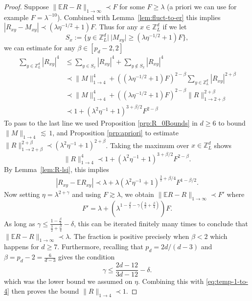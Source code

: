 \documentclass[11pt]{amsart}
\def\bbZ{{\mathbb Z}}
\def\Expec{{\mathbb E}}
\def\lsim{{\,\lesssim\,}}
\newcommand{\ldom}{\prec}
\numberwithin{equation}{section}
\numberwithin{theorem}{section}
\begin{document}
\begin{proof}
Suppose $\|\mathbb{E}R-R\|_{1\to\infty} \ldom F$ for some $F\geq \lambda $ (a priori we can use for example $F = \lambda^{-10}$).
Combined with Lemma~\ref{lem:fluct-to-er} this implies $|R_{xy}-M_{xy}| \ldom (\lambda \eta^{-1/2}+1)F$.
Thus for any $x\in \mathbb{Z}^d_L$ if we let
$$S_x:=\{y\in \mathbb{Z}^d_L |\ |M_{xy}|\geq (\lambda \eta^{-1/2}+1)F\},$$
we can estimate for any $\beta\in[p_d-2,2]$
\begin{align*}
\sum_{y\in \bbZ^d_L} |R_{xy}|^4
&\leq \sum_{y\in S_{x}} |R_{xy}|^4 + \sum_{y\notin S_{x}} |R_{xy}|^4 \\
&\ldom \|M\|_{1\to 4}^4 + ((\lambda \eta^{-1/2} +1)F)^{2-\beta} \sum_{y\in \bbZ^d_L} |R_{xy}|^{2+\beta} \\
&\ldom \|M\|_{1\to 4}^4 + ((\lambda \eta^{-1/2}+1) F)^{2-\beta} \|R\|_{1\to 2+\beta}^{2+\beta}\\
& \ldom 1 + (\lambda^2 \eta^{-1}+1)^{3+\beta/2} F^{2-\beta}
\end{align*}
To pass to the last line we used Proposition \ref{prp:R_0Bounds} in $d\geq 6$ to bound $\|M\|_{1\to 4}\lsim 1$,
and Proposition \ref{prp:apriori} to estimate $\|R\|_{1\to 2+\beta}^{2+\beta}\ldom (\lambda^2\eta^{-1}+1)^{2+\beta}$.
Taking the maximum over $x\in\bbZ^d_L$ shows
\begin{equation}
\label{eq:temp-1-to-4}
\|R\|_{1\to 4}^4\ldom 1 + (\lambda^2 \eta^{-1}+1)^{3+\beta/2} F^{2-\beta}.
\end{equation}
By Lemma~\ref{lem:R-lsi}, this implies
\begin{align*}
|R_{xy} - \Expec R_{xy}| \ldom \lambda + \lambda (\lambda^2\eta^{-1}+1)^{\frac32 + \beta/4} F^{1-\beta/2}.
\end{align*}
Now setting $\eta = \lambda^{2+\gamma}$ and using $F\gtrsim \lambda$, we obtain $\|\Expec R -R\|_{1\to\infty} \ldom F'$ where
\[
F' = \lambda + (\lambda^{1-\frac\beta2-\gamma(\frac32+\frac\beta4)}) F.
\]
As long as $\gamma \leq  \frac{1-\frac\beta2}{\frac{3}{2}+\frac{\beta}{4}} - \delta$, this can be iterated finitely
many times to conclude that $\|\Expec R - R\|_{1\to\infty} \ldom \lambda$. The fraction is positive precisely when $\beta<2$ which happens for $d\geq 7$. Furthermore, recalling that $p_d = 2d/(d-3)$ and $\beta = p_d-2 = \frac{6}{d-3}$ gives the condition
$$\gamma \leq \frac{2d-12}{3d-12} - \delta.
$$
which was the lower bound we assumed on $\eta$.
Combining this with \eqref{eq:temp-1-to-4} then proves the bound $\|R\|_{1\to 4}\ldom 1$.
\end{proof}
\end{document}

